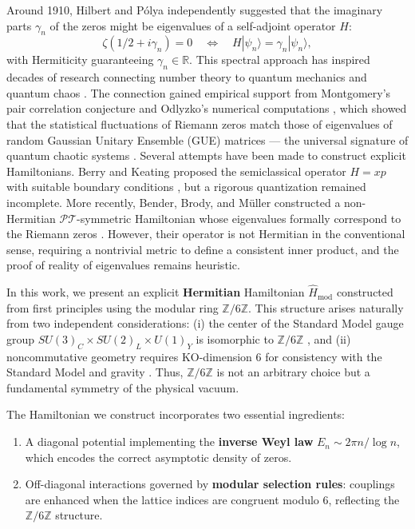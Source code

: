 \documentclass[prl,aps,floatfix,superscriptaddress,10pt]{revtex4-2}
\newcommand{\Zmod}{\mathbb{Z}/6\mathbb{Z}}
\begin{document}
Around 1910, Hilbert and P\'olya independently suggested that the imaginary parts $\gamma_n$ of the zeros might be eigenvalues of a self-adjoint operator $H$:
\begin{equation}
\zeta(1/2 + i\gamma_n) = 0 \quad \Longleftrightarrow \quad H|\psi_n\rangle = \gamma_n |\psi_n\rangle,
\end{equation}
with Hermiticity guaranteeing $\gamma_n \in \mathbb{R}$.
This spectral approach has inspired decades of research connecting number theory to quantum mechanics and quantum chaos \cite{Montgomery1973, Berry1986, KeatingSnaith2000}.
The connection gained empirical support from Montgomery's pair correlation conjecture \cite{Montgomery1973} and Odlyzko's numerical computations \cite{Odlyzko2001}, which showed that the statistical fluctuations of Riemann zeros match those of eigenvalues of random Gaussian Unitary Ensemble (GUE) matrices --- the universal signature of quantum chaotic systems \cite{Bohigas1984}.
Several attempts have been made to construct explicit Hamiltonians. Berry and Keating proposed the semiclassical operator $H = xp$ with suitable boundary conditions \cite{BerryKeating1999}, but a rigorous quantization remained incomplete.
More recently, Bender, Brody, and M\"uller constructed a non-Hermitian $\mathcal{PT}$-symmetric Hamiltonian whose eigenvalues formally correspond to the Riemann zeros \cite{Bender2017}. However, their operator is not Hermitian in the conventional sense, requiring a nontrivial metric to define a consistent inner product, and the proof of reality of eigenvalues remains heuristic.

In this work, we present an explicit \textbf{Hermitian} Hamiltonian $\hat{H}_{\text{mod}}$ constructed from first principles using the modular ring $\mathbb{Z}/6\mathbb{Z}$. This structure arises naturally from two independent considerations: (i) the center of the Standard Model gauge group $SU(3)_C \times SU(2)_L \times U(1)_Y$ is isomorphic to $\mathbb{Z}/6\mathbb{Z}$ \cite{Connes2008}, and (ii) noncommutative geometry requires KO-dimension 6 for consistency with the Standard Model and gravity \cite{Chamseddine2007}. Thus, $\Zmod$ is not an arbitrary choice but a fundamental symmetry of the physical vacuum.

The Hamiltonian we construct incorporates two essential ingredients:
\begin{enumerate}
    \item A diagonal potential implementing the \textbf{inverse Weyl law} $E_n \sim 2\pi n / \log n$, which encodes the correct asymptotic density of zeros.
    \item Off-diagonal interactions governed by \textbf{modular selection rules}: couplings are enhanced when the lattice indices are congruent modulo 6, reflecting the $\Zmod$ structure.
\end{enumerate}
\end{document}

